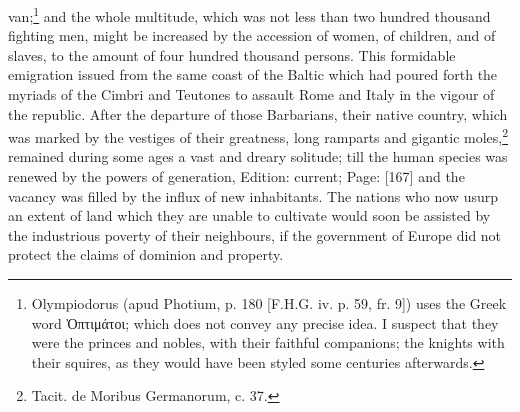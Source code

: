 van;\footnote{Olympiodorus (apud Photium, p. 180 [F.H.G. iv. p. 59, fr. 9]) uses the Greek word \textgreek{\texthebrew{Ὀ}πτιμάτοι}; which does not convey any precise idea. I suspect that they were the princes and nobles, with their faithful companions; the knights with their squires, as they would have been styled some centuries afterwards.} and the whole multitude, which was not less than two hundred thousand fighting men, might be increased by the accession of women, of children, and of slaves, to the amount of four hundred thousand persons. This formidable emigration issued from the same coast of the Baltic which had poured forth the myriads of the Cimbri and Teutones to assault Rome and Italy in the vigour of the republic. After the departure of those Barbarians, their native country, which was marked by the vestiges of their greatness, long ramparts and gigantic moles,\footnote{Tacit. de Moribus Germanorum, c. 37.} remained during some ages a vast and dreary solitude; till the human species was renewed by the powers of generation, Edition: current; Page: [167] and the vacancy was filled by the influx of new inhabitants. The nations who now usurp an extent of land which they are unable to cultivate would soon be assisted by the industrious poverty of their neighbours, if the government of Europe did not protect the claims of dominion and property.

